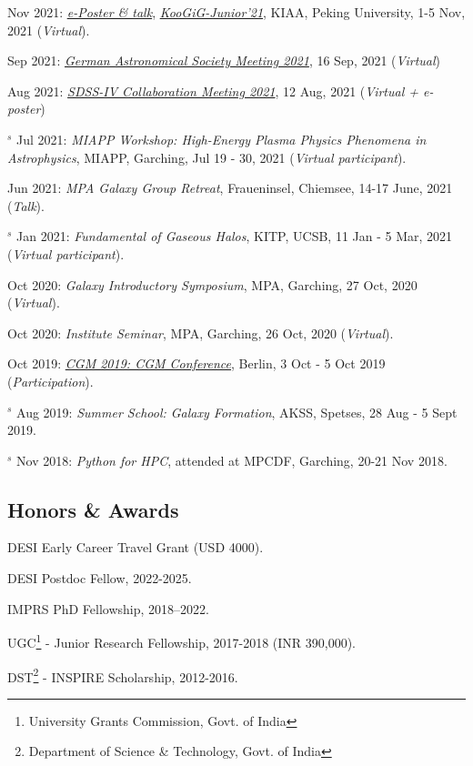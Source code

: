 \documentclass[12pt,letterpaper]{article}
\begin{document}
\begin{list}{}{\cvlist}
\item Nov 2021:  \emph{\href{https://www.bilibili.com/video/BV1nv411M7w3}{e-Poster \& talk}}, \emph{\href{https://kiaa.pku.edu.cn/KooGig_junior21/Home.htm}{KooGiG-Junior'21}}, KIAA, Peking University, 1-5 Nov, 2021 (\textit{Virtual}).   

\item Sep 2021:  \emph{\href{https://ag2021.astronomische-gesellschaft.de/view_splinter.php?session=Stars}{German Astronomical Society Meeting 2021}}, 16 Sep, 2021 (\textit{Virtual})   
\item Aug 2021:  \emph{\href{https://jhu2021.sdss.org/}{SDSS-IV Collaboration Meeting 2021}}, 12 Aug, 2021 (\textit{Virtual + e-poster})   
\item $^s$ Jul 2021:  \emph{MIAPP Workshop: High-Energy Plasma Physics Phenomena in Astrophysics}, MIAPP, Garching, Jul 19 - 30, 2021 (\textit{Virtual participant}).  

\item Jun 2021:  \emph{MPA Galaxy Group Retreat}, Fraueninsel, Chiemsee, 14-17 June, 2021 (\textit{Talk}).  
\item $^s$ Jan 2021:  \emph{Fundamental of Gaseous Halos}, KITP, UCSB, 11 Jan - 5 Mar, 2021 (\textit{Virtual participant}).  
\item Oct 2020:  \emph{Galaxy Introductory Symposium}, MPA, Garching, 27 Oct, 2020 (\textit{Virtual}).  
\item Oct 2020:  \emph{Institute Seminar}, MPA, Garching, 26 Oct, 2020 (\textit{Virtual}).  

\item Oct 2019:  \emph{\href{https://wwwmpa.mpa-garching.mpg.de/conf/berlincgm2019/}{CGM 2019: CGM Conference}}, Berlin, 3 Oct - 5 Oct 2019 (\textit{Participation}).  
\item $^s$ Aug 2019:  \emph{Summer School: Galaxy Formation}, AKSS, Spetses, 28 Aug - 5 Sept 2019.  
\item $^s$ Nov 2018:  \emph{Python for HPC}, attended at MPCDF, Garching, 20-21 Nov 2018.  

\end{list}

\subsection{Honors \& Awards}
\begin{list}{}{\cvlist}
  \item DESI Early Career Travel Grant (USD 4000).
  \item DESI Postdoc Fellow, 2022-2025.
  \item IMPRS PhD Fellowship, 2018--2022.
  \item UGC\footnote{University Grants Commission, Govt. of India} - Junior Research Fellowship, 2017-2018 (INR 390,000).
  \item DST\footnote{Department of Science \& Technology, Govt. of India} - INSPIRE Scholarship, 2012-2016.

\end{list}
\end{document}
